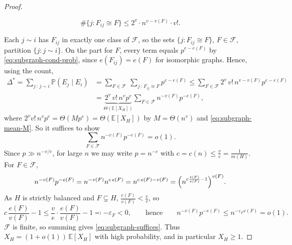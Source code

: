 \begin{proof}
\begin{itemize}
        \[
            \#\bigl\{ j : F_{ij} \cong F \bigr\} \le 2^{v} \cdot n^{v - v(F)} \cdot v! .
        \]
    \end{itemize}
    Each \(j \sim i\) has \(F_{ij}\) in exactly one class of \(\mathcal{F}\), so the sets \(\{j : F_{ij} \cong F\}\), \(F \in \mathcal{F}\), partition \(\{j : j \sim i\}\). On the part for \(F\), every term equals \(p^{e - e(F)}\) by \eqref{eq:subgraph-cond-prob}, since \(e(F_{ij}) = e(F)\) for isomorphic graphs. Hence, using the count,
    \[
        \begin{aligned}
            \Delta^{*}
            = \sum_{j \,:\, j \sim i} \mathbb{P}(E_j \mid E_i)
            &= \sum_{F \in \mathcal{F}} \ \sum_{j \,:\, F_{ij} \cong F} p^{e - e(F)}
            \le \sum_{F \in \mathcal{F}} 2^{v}\, v!\, n^{v - v(F)} p^{e - e(F)} \\
            &= \underbrace{2^{v}\, v!\, n^{v} p^{e}}_{\Theta(\mathbb{E}[X_H])} \sum_{F \in \mathcal{F}} n^{-v(F)} p^{-e(F)} ,
        \end{aligned}
    \]
    where \(2^{v} v!\, n^{v} p^{e} = \Theta(M p^{e}) = \Theta(\mathbb{E}[X_H])\) by \(M = \Theta(n^{v})\) and \eqref{eq:subgraph-mean-M}. So it suffices to show
    \begin{equation}\label{eq:subgraph-suffices}
        \sum_{F \in \mathcal{F}} n^{-v(F)} p^{-e(F)} = o(1).
    \end{equation}
    Since \(p \gg n^{-v/e}\), for large \(n\) we may write \(p = n^{-c}\) with \(c = c(n) \le \frac{v}{e} = \frac{1}{m(H)}\). For \(F \in \mathcal{F}\),
    \[
        n^{-v(F)} p^{-e(F)} = n^{-v(F)} n^{c\,e(F)} = n^{c\,e(F) - v(F)} = \Bigl( n^{c \frac{e(F)}{v(F)} - 1} \Bigr)^{v(F)} .
    \]
    As \(H\) is strictly balanced and \(F \subsetneq H\), \(\frac{e(F)}{v(F)} < \frac{e}{v}\), so
    \[
        c\,\frac{e(F)}{v(F)} - 1 \le \frac{v}{e} \cdot \frac{e(F)}{v(F)} - 1 \eqqcolon -\varepsilon_F < 0,
        \qquad\text{hence}\qquad
        n^{-v(F)} p^{-e(F)} \le n^{-\varepsilon_F v(F)} = o(1).
    \]
    \(\mathcal{F}\) is finite, so summing gives \eqref{eq:subgraph-suffices}. Thus \(X_H = (1+o(1))\,\mathbb{E}[X_H]\) with high probability, and in particular \(X_H \ge 1\).
\end{proof}

